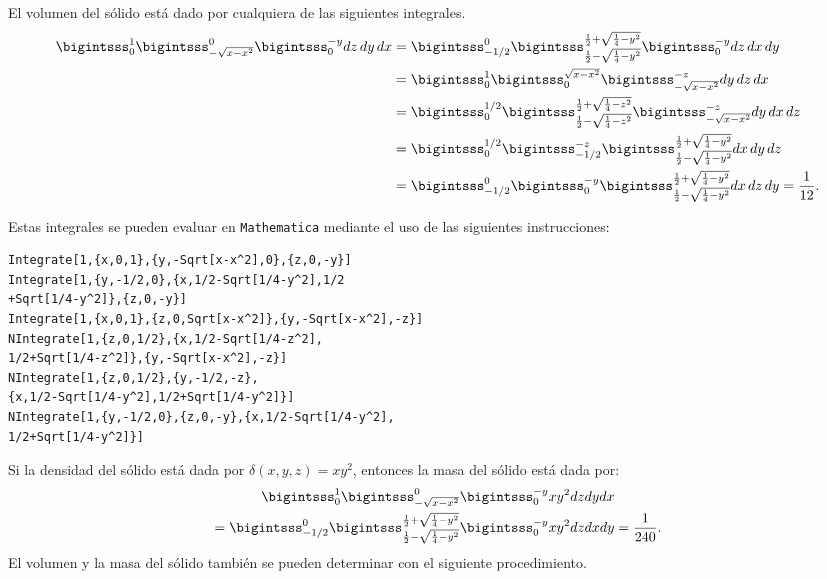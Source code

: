 El volumen del sólido está dado por cualquiera de las siguientes integrales.
\begin{gather*}
\begin{aligned}
  \bigintsss_{0}^{1} \bigintsss_{-\sqrt{x-x^{2}}}^{0}\ds \bigintsss_{0}^{-y}dz\,dy\,dx &= \bigintsss_{-1/2}^{0}\bigintsss_{\frac{1}{2}-\sqrt{\frac{1}{4}-y^{2}}}^{\frac{1}{2}+ \sqrt{\frac{1}{4}-y^{2}}}\bigintsss_{0}^{-y}dz\,dx\,dy \\
  &= \bigintsss_{0}^{1}\bigintsss_{0}^{\sqrt{x-x^{2}}} \bigintsss_{-\sqrt{x-x^{2}}}^{-z}dy\,dz\,dx \\
  &= \bigintsss_{0}^{1/2}\bigintsss_{\frac{1}{2}-\sqrt{\frac{1}{4}-z^{2}}}^{\frac{1}{2}+ \sqrt{\frac{1}{4}-z^{2}}}\bigintsss_{-\sqrt{x-x^{2}}}^{-z}dy\,dx\,dz \\
  &= \bigintsss_{0}^{1/2}\bigintsss_{-1/2}^{-z}\bigintsss_{\frac{1}{2}-\sqrt{\frac{1}{4}-y^{2}}}^{\frac{1}{2}+\sqrt{\frac{1}{4}-y^{2}}}dx\,dy\,dz \\
  &= \bigintsss_{-1/2}^{0} \bigintsss_{0}^{-y}\bigintsss_{\frac{1}{2}-\sqrt{\frac{1}{4}-y^{2}}}^{\frac{1}{2}+\sqrt{\frac{1}{4}-y^{2}}}dx\,dz\,dy = \frac{1}{12}.
\end{aligned}
\end{gather*}

Estas integrales se pueden evaluar en \verb"Mathematica" mediante el uso de las siguientes instrucciones:

\begin{tcolorbox}[title=\bf Instrucción en \verb"Mathematica"]\begin{Verbatim}[formatcom=\letraverbatim]
Integrate[1,{x,0,1},{y,-Sqrt[x-x^2],0},{z,0,-y}]
Integrate[1,{y,-1/2,0},{x,1/2-Sqrt[1/4-y^2],1/2
+Sqrt[1/4-y^2]},{z,0,-y}]
Integrate[1,{x,0,1},{z,0,Sqrt[x-x^2]},{y,-Sqrt[x-x^2],-z}]
NIntegrate[1,{z,0,1/2},{x,1/2-Sqrt[1/4-z^2],
1/2+Sqrt[1/4-z^2]},{y,-Sqrt[x-x^2],-z}]
NIntegrate[1,{z,0,1/2},{y,-1/2,-z},
{x,1/2-Sqrt[1/4-y^2],1/2+Sqrt[1/4-y^2]}]
NIntegrate[1,{y,-1/2,0},{z,0,-y},{x,1/2-Sqrt[1/4-y^2],
1/2+Sqrt[1/4-y^2]}]
\end{Verbatim}
\end{tcolorbox}

Si la densidad del sólido está dada por $\delta(x,y,z) =xy^{2}$, entonces la masa del sólido está dada por:
\begin{multline*} \bigintsss_{0}^{1}\bigintsss_{-\sqrt{x-x^{2}}}^{0}\bigintsss_{0}^{-y}xy^{2}dzdydx \\ =\bigintsss_{-1/2}^{0}\bigintsss_{\frac{1}{2}-\sqrt{\frac{1}{4}-y^{2}}}^{\frac{1}{2}+\sqrt{\frac{1}{4}-y^{2}}}\bigintsss_{0}^{-y}xy^{2}dzdxdy= \frac{1}{240}.
\end{multline*}
El volumen y la masa del sólido también se pueden determinar con el siguiente procedimiento.

